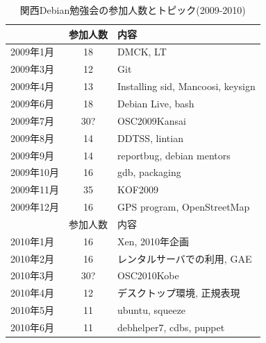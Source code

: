 \documentclass[mingoth,a4paper]{jsarticle}
\begin{document}
\begin{table}
  \begin{minipage}{0.5\hsize}
    \caption{関西Debian勉強会の参加人数とトピック(2009-2010)}
    \begin{center}
      \begin{tabular}{|l|c|p{10em}|}
        \hline
                   & 参加人数 & 内容 \\
        \hline
        2009年1月  & 18       & DMCK, LT \\
        2009年3月  & 12       & Git \\
        2009年4月  & 13       & Installing sid, Mancoosi, keysign \\
        2009年6月  & 18       & Debian Live, bash\\
        2009年7月  & 30?      & OSC2009Kansai \\
        2009年8月  & 14       & DDTSS, lintian \\
        2009年9月  & 14       & reportbug, debian mentors\\
        2009年10月 & 16       & gdb, packaging \\
        2009年11月 & 35       & KOF2009 \\
        2009年12月 & 16       & GPS program, OpenStreetMap \\
        \hline
        \hline
                   & 参加人数 & 内容 \\
        \hline
        2010年1月  & 16       & Xen, 2010年企画 \\
        2010年2月  & 16       & レンタルサーバでの利用, GAE \\
        2010年3月  & 30?      & OSC2010Kobe \\
        2010年4月  & 12       & デスクトップ環境, 正規表現 \\
        2010年5月  & 11       & ubuntu, squeeze \\
        2010年6月  & 11       & debhelper7, cdbs, puppet \\

\end{tabular}
\end{center}
\end{minipage}
\end{table}
\end{document}
